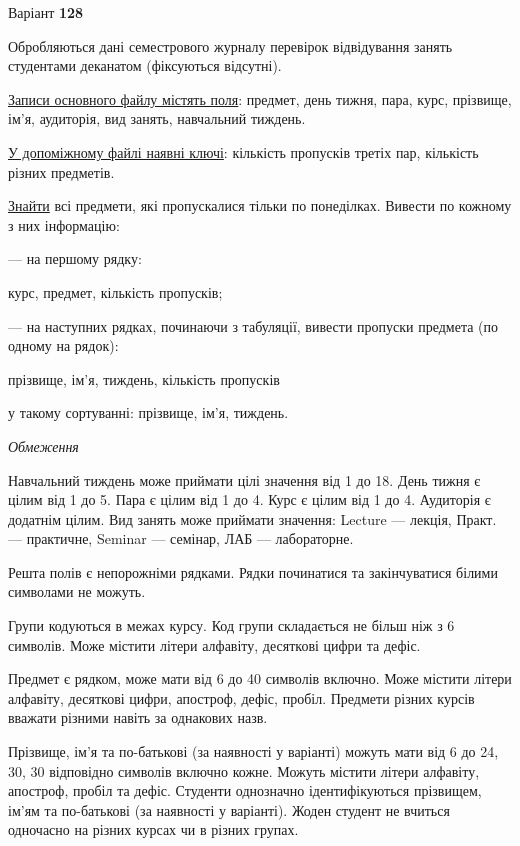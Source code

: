 \documentclass[11pt, ukrainian]{article}
\begin{document}
\par
\newpage
{\center Варіант  \No \textbf { 128 }\par}
\bigskip
Обробляються дані семестрового журналу перевірок відвідування занять студентами деканатом (фіксуються відсутні). 

\underline{Записи основного файлу містять поля}: предмет, день тижня, пара, курс, прізвище, ім’я, аудиторія, вид занять, навчальний тиждень.

\underline{У допоміжному файлі наявні ключі}: кількість пропусків третіх пар, кількість різних предметів.

\underline{Знайти} всі предмети, які пропускалися тільки по понеділках. Вивести по кожному з них інформацію:\par
{\noindent}--- на першому рядку:\par
курс, предмет, кількість пропусків;

{\noindent}--- на наступних рядках, починаючи з табуляції, вивести пропуски предмета (по одному на рядок):\par
прізвище, ім’я, тиждень, кількість пропусків

{\noindent}у такому сортуванні: прізвище, ім’я, тиждень.


\bigskip\textit{Обмеження}

Навчальний тиждень може приймати цілі значення від 1 до 18.
День тижня є цілим від 1 до 5. Пара є цілим від 1 до 4.
Курс є цілим від 1 до 4. Аудиторія є додатнім цілим.
Вид занять може приймати значення:
Lecture --- лекція, Практ. --- практичне, Seminar --- семінар, ЛАБ --- лабораторне.

Решта полів є непорожніми рядками.
Рядки починатися та закінчуватися білими символами не можуть.

Групи кодуються в межах курсу.
Код групи складається не більш ніж з 6 символів.
Може містити літери алфавіту, десяткові цифри та дефіс.

Предмет є рядком, може мати від 6 до 40 символів включно.
Може містити літери алфавіту, десяткові цифри, апостроф, дефіс, пробіл.
Предмети різних курсів вважати різними навіть за однакових назв.

Прізвище, ім’я та по-батькові (за наявності у варіанті)
можуть мати від 6 до 24, 30, 30 відповідно символів включно кожне.
Можуть містити літери алфавіту, апостроф, пробіл та дефіс.
Студенти однозначно ідентифікуються прізвищем, ім’ям та по-батькові (за наявності у варіанті).
Жоден студент не вчиться одночасно на різних курсах чи в різних групах.
\end{document}

